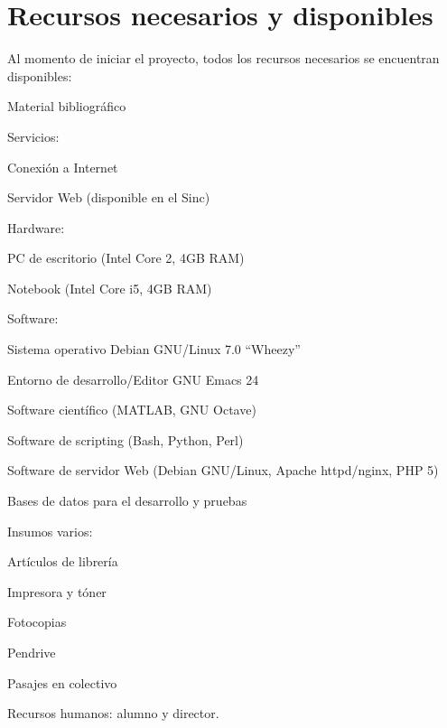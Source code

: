 \documentclass[12pt,bibliography=oldstyle,DIV=12,parskip=full-,titlepage]{scrartcl}
\begin{document}
\section{Recursos necesarios y disponibles}
Al momento de iniciar el proyecto, todos los recursos necesarios se
encuentran disponibles:
\begin{itemize*}
\item Material bibliográfico
\item Servicios:
  \begin{itemize*}
  \item Conexión a Internet
  \item Servidor Web (disponible en el Sinc)
  \end{itemize*}
\item Hardware:
  \begin{itemize*}
  \item PC de escritorio (Intel Core 2, 4GB RAM)
  \item Notebook (Intel Core i5, 4GB RAM)
  \end{itemize*}
\item Software:
  \begin{itemize*}
  \item Sistema operativo Debian GNU/Linux 7.0 ``Wheezy''
  \item Entorno de desarrollo/Editor GNU Emacs 24
  \item Software científico (MATLAB, GNU Octave)
  \item Software de scripting (Bash, Python, Perl)
  \item Software de servidor Web (Debian GNU/Linux, Apache
    httpd/nginx, PHP 5)
  \end{itemize*}
\item Bases de datos para el desarrollo y pruebas
\item Insumos varios:
  \begin{itemize*}
  \item Artículos de librería
  \item Impresora y tóner
  \item Fotocopias
  \item Pendrive
  \item Pasajes en colectivo
  \end{itemize*}
\item Recursos humanos: alumno y director.
\end{itemize*}
%
%
\newpage
\end{document}
